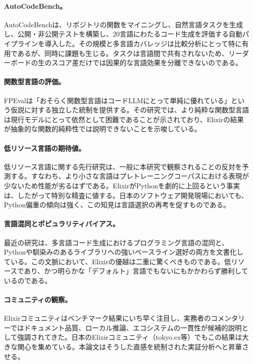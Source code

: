 \documentclass[11pt]{article}
\newcommand{\acb}{AutoCodeBench}
\newcommand{\elixir}{Elixir}
\newcommand{\pythonlang}{Python}
\begin{document}
\paragraph{AutoCodeBench。}
\acb{}は、リポジトリの関数をマイニングし、自然言語タスクを生成し、公開・非公開テストを構築し、20言語にわたるコード生成を評価する自動パイプラインを導入した\cite{acb}。その規模と多言語カバレッジは比較分析にとって特に有用であるが、同時に課題も生じる。タスクは言語間で共有されないため、リーダーボードの生のスコア差だけでは因果的な言語効果を分離できないのである。

\paragraph{関数型言語の評価。}
FPEvalは「おそらく関数型言語はコードLLMにとって単純に優れている」という仮説に対する独立した統制を提供する\cite{fpeval}。その研究では、より純粋な関数型言語は現行モデルにとって依然として困難であることが示されており、\elixir{}の結果が抽象的な関数的純粋性では説明できないことを示唆している。

\paragraph{低リソース言語の期待値。}
低リソース言語に関する先行研究は、一般に本研究で観察されることの反対を予測する。すなわち、より小さな言語はプレトレーニングコーパスにおける表現が少ないため性能が劣るはずである\cite{lowresource}。\elixir{}が\pythonlang{}を劇的に上回るという事実は、したがって特別な精査に値する。日本のソフトウェア開発現場においても、Python偏重の傾向は強く、この知見は言語選択の再考を促すものである。

\paragraph{言語混同とポピュラリティバイアス。}
最近の研究は、多言語コード生成におけるプログラミング言語の混同\cite{plconfusion}と、Pythonや馴染みのあるライブラリへの強いベースライン選好\cite{llmpreferences}の両方を文書化している。この文脈において、\elixir{}の優越は二重に驚くべきものである。低リソースであり、かつ明らかな「デフォルト」言語でもないにもかかわらず勝利しているのである。

\paragraph{コミュニティの観察。}
\elixir{}コミュニティはベンチマーク結果にいち早く注目し、実務者のコメンタリーではドキュメント品質、ローカル推論、エコシステムの一貫性が候補的説明として強調されてきた\cite{dashbit,ronacher}。日本のElixirコミュニティ（tokyo.ex等）でもこの結果は大きな関心を集めている。本論文はそうした直感を統制された実証分析へと昇華させる。
\end{document}
